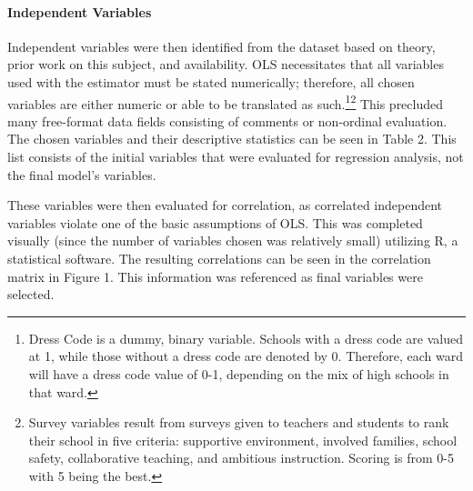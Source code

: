 \documentclass[12pt]{article}
\begin{document}
\paragraph{Independent Variables}
Independent variables were then identified from the dataset based on theory, prior work on this subject, and availability.  OLS necessitates that all variables used with the estimator must be stated numerically; therefore, all chosen variables are either numeric or able to be translated as such.\footnote{Dress Code is a dummy, binary variable.  Schools with a dress code are valued at 1, while those without a dress code are denoted by 0.  Therefore, each ward will have a dress code value of 0-1, depending on the mix of high schools in that ward.}\footnote{Survey variables result from surveys given to teachers and students to rank their school in five criteria:  supportive environment, involved families, school safety, collaborative teaching, and ambitious instruction.  Scoring is from 0-5 with 5 being the best.}  This precluded many free-format data fields consisting of comments or non-ordinal evaluation.  The chosen variables and their descriptive statistics can be seen in Table 2.  This list consists of the initial variables that were evaluated for regression analysis, not the final model's variables.
\par
These variables were then evaluated for correlation, as correlated independent variables violate one of the basic assumptions of OLS.  This was completed visually (since the number of variables chosen was relatively small) utilizing R, a statistical software.  The resulting correlations can be seen in the correlation matrix in Figure 1.  This information was referenced as final variables were selected.
\end{document}
